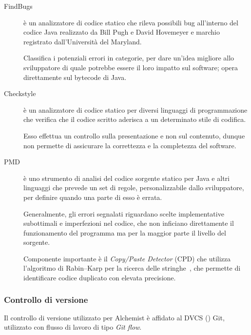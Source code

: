                 \begin{description}
                    \item[FindBugs\label{itm:FindBugs}\footnotemark]
                        è un analizzatore di codice statico  che rileva possibili bug all'interno del codice Java realizzato da Bill Pugh e David Hovemeyer e marchio registrato dall'Università del Maryland.

                        Classifica i potenziali errori in categorie, per dare un'idea migliore allo sviluppatore di quale potrebbe essere il loro impatto sul software;
                        opera direttamente sul bytecode di Java.

                    \item[Checkstyle\label{itm:Checkstyle}\footnotemark]
                        è un analizzatore di codice statico  per diversi linguaggi di programmazione che verifica che il codice scritto aderisca a un determinato stile di codifica.

                        Esso effettua un controllo sulla presentazione e non sul contenuto, dunque non permette di assicurare la correttezza e la completezza del software.

                    \item[PMD\label{itm:PMD}\footnotemark]
                        è uno strumento di analisi del codice sorgente statico per Java e altri linguaggi che prevede un set di regole, personalizzabile dallo sviluppatore, per definire quando una parte di esso è errata.

                        Generalmente, gli errori segnalati riguardano scelte implementative subottimali e imperfezioni nel codice, che non inficiano direttamente il funzionamento del programma ma per la maggior parte il livello del sorgente.

                        Componente importante è il \emph{Copy/Paste Detector} (CPD) che utilizza l'algoritmo di Rabin–Karp per la ricerca delle stringhe~\cite{RabinKarp}, che permette di identificare codice duplicato con elevata precisione.
                \end{description}

            \subsubsection{Controllo di versione}\label{subsubsec:hosting}
                Il controllo di versione utilizzato per Alchemist è affidato al DVCS () Git, utilizzato con flusso di lavoro di tipo \emph{Git flow}.

